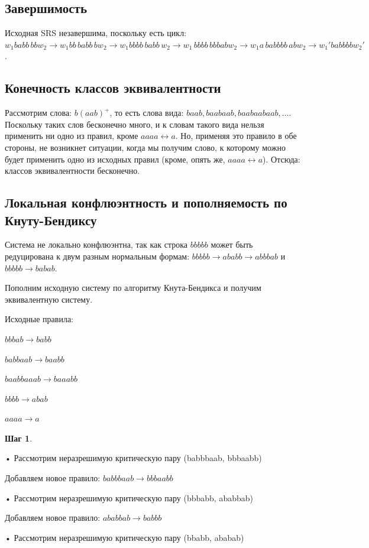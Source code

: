 \documentclass[a4paper, 14pt]{extarticle}
\begin{document}
\subsection{Завершимость}
Исходная SRS незавершима, поскольку есть цикл: $w_1 babb \, bbw_2 \to w_1bb \, babb \, bw_2 \to w_1 bbbb \, babb \, w_2 \to w_1 \, bbbb \, bbbab w_2 \to w_1 a \, babbbb \, ab w_2 \to w_1' babbbb w_2'$.

\subsection{Конечность классов эквивалентности}

Рассмотрим слова: $b(aab)^+$, то есть слова вида: $baab, baabaab, baabaabaab, \ldots$. Поскольку таких слов бесконечно много, и к словам такого вида нельзя применить ни одно из правил, кроме $aaaa \leftrightarrow a$. Но, применяя это правило в обе стороны, не возникнет ситуации, когда мы получим слово, к которому можно будет применить одно из исходных правил (кроме, опять же, $aaaa \leftrightarrow a$). Отсюда: классов эквивалентности бесконечно. 

\subsection{Локальная конфлюэнтность и пополняемость по Кнуту-Бендиксу}

Система не локально конфлюэнтна, так как строка $bbbbb$ может быть редуцирована к двум разным нормальным формам: $bbbbb \to ababb \to abbbab$ и $bbbbb \to babab$.

Пополним исходную систему по алгоритму Кнута-Бендикса и получим эквивалентную систему.

Исходные правила:

$bbbab \to babb$

$babbaab \to baabb$

$baabbaaab \to baaabb$

$bbbb \to abab$

$aaaa \to a$


 \textbf{Шаг 1}.

   • Рассмотрим неразрешимую критическую пару (babbbaab, bbbaabb)

        Добавляем новое правило: $babbbaab \to bbbaabb$

   • Рассмотрим неразрешимую критическую пару (bbbabb, ababbab)

        Добавляем новое правило: $ababbab \to babbb$

   • Рассмотрим неразрешимую критическую пару (bbabb, ababab)
\end{document}
